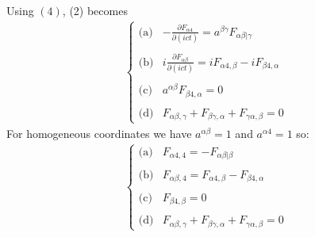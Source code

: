 Using $(4)$, (2) becomes
\begin{align}
\left\{\begin{array}{ll}
\text{(a)}&-\frac{\partial F_{\alpha4}}{\partial (ict)}= a^{\beta\gamma}F_{\alpha\beta|\gamma}\\\\
\text{(b)}&i\frac{\partial F_{\alpha\beta}}{\partial (ict)}= iF_{\alpha4,\beta}-iF_{\beta4,\alpha}\\\\
\text{(c)}&a^{\alpha\beta}F_{\beta4,\alpha}=0\\\\
\text{(d)}&F_{\alpha\beta,\gamma}+F_{\beta\gamma,\alpha}+F_{\gamma\alpha,\beta}=0
\end{array}\right.
\end{align}
For homogeneous coordinates we have $a^{\alpha\beta}=1$ and $a^{\alpha4}=1$ so:
\begin{align}
\left\{\begin{array}{ll}
\text{(a)}&F_{\alpha4,4}= -F_{\alpha\beta|\beta}\\\\
\text{(b)}& F_{\alpha\beta,4}= F_{\alpha4,\beta}-F_{\beta4,\alpha}\\\\
\text{(c)}&F_{\beta4,\beta}=0\\\\
\text{(d)}&F_{\alpha\beta,\gamma}+F_{\beta\gamma,\alpha}+F_{\gamma\alpha,\beta}=0
\end{array}\right.
\end{align}

